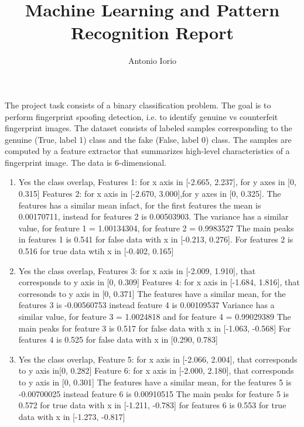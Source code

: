 \documentclass[]{report}
\title{Machine Learning and Pattern Recognition Report}
\author{Antonio Iorio}
\begin{document}

The project task consists of a binary classification problem. The goal is to perform fingerprint spoofing
detection, i.e. to identify genuine vs counterfeit fingerprint images. The dataset consists of labeled
samples corresponding to the genuine (True, label 1) class and the fake (False, label 0) class. The
samples are computed by a feature extractor that summarizes high-level characteristics of a fingerprint
image. The data is 6-dimensional.

\begin{enumerate}
      \item Yes the class overlap, 
            Features 1: for x axis in [-2.665, 2.237], for y axes in [0, 0.315]
            Features 2: for x axis in [-2.670, 3.000],for y axes in [0, 0.325].
            The features has a similar mean infact, for the first features the mean is 0.00170711,
            instead for features 2 is 0.00503903.
            The variance has a similar value, for feature 1 = 1.00134304, for feature 2 = 0.9983527
            The main peaks in features 1 is 0.541 for false data with x in [-0.213, 0.276].
            For features 2 is 0.516 for true data wtih x in [-0.402, 0.165]

      \item Yes the class overlap,
            Features 3: for x axis in [-2.009, 1.910], that corresponds to y axis in [0, 0.309]
            Features 4: for x axis in [-1.684, 1.816], that corresonds to y axis in [0, 0.371]
            The features have a similar mean, for the features 3 is -0.00560753 instead feature 4
            is 0.00109537
            Variance has a similar value, for feature 3 = 1.0024818 and for feature 4 = 0.99029389 
            The main peaks for feature 3 is 0.517 for false data with x in [-1.063, -0.568]
            For features 4 is 0.525 for false data with x in [0.290, 0.783]
          
      \item Yes the class overlap,
            Feature 5: for x axis in [-2.066, 2.004], that corresponds to y axis in[0, 0.282]
            Feature 6: for x axis in [-2.000, 2.180], that corresponds to y axis in [0, 0.301]
            The features have a similar mean, for the features 5 is -0.00700025 instead feature 6
            is 0.00910515
            The main peaks for feature 5 is 0.572 for true data with x in [-1.211, -0.783]
            for features 6 is 0.553 for true data with x in [-1.273, -0.817]
\end{enumerate}
\end{document}
